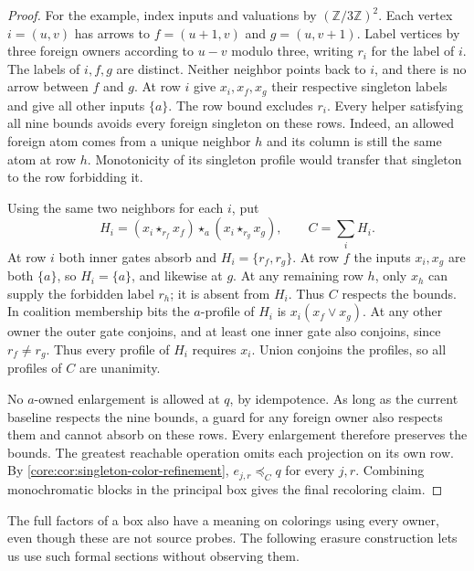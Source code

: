 \begin{proof}
For the example, index inputs and valuations by
$(\mathbb Z/3\mathbb Z)^2$. Each vertex $i=(u,v)$ has arrows to
$f=(u+1,v)$ and $g=(u,v+1)$. Label vertices by three foreign owners
according to $u-v$ modulo three, writing $r_i$ for the label of $i$.
The labels of $i,f,g$ are distinct. Neither neighbor points back to $i$,
and there is no arrow between $f$ and $g$.
At row $i$ give $x_i,x_f,x_g$ their respective singleton labels
and give all other inputs $\{a\}$. The row bound excludes $r_i$.
Every helper satisfying all nine bounds avoids every foreign singleton
on these rows. Indeed, an allowed foreign atom comes from a unique
neighbor $h$ and its column is still the same atom at row $h$.
Monotonicity of its singleton profile would transfer that singleton
to the row forbidding it.

Using the same two neighbors for each $i$, put
\[
 H_i=(x_i\star_{r_f}x_f)\star_a(x_i\star_{r_g}x_g),
 \qquad C=\sum_i H_i .
\]
At row $i$ both inner gates absorb and $H_i=\{r_f,r_g\}$. At row
$f$ the inputs $x_i,x_g$ are both $\{a\}$, so $H_i=\{a\}$, and
likewise at $g$. At any remaining row $h$, only $x_h$ can supply
the forbidden label $r_h$; it is absent from $H_i$. Thus $C$ respects
the bounds. In coalition membership bits the $a$-profile of $H_i$
is $x_i(x_f\lor x_g)$. At any other owner the outer gate conjoins,
and at least one inner gate also conjoins, since $r_f\ne r_g$. Thus
every profile of $H_i$ requires $x_i$. Union conjoins the profiles,
so all profiles of $C$ are unanimity.

No $a$-owned enlargement is allowed at $q$, by idempotence.
As long as the current baseline respects the nine bounds, a guard
for any foreign owner also respects them and cannot absorb on these
rows. Every enlargement therefore preserves the bounds. The greatest
reachable operation omits each projection on its own row. By
\cref{core:cor:singleton-color-refinement}, $e_{j,r}\preceq_Cq$
for every $j,r$. Combining monochromatic blocks in the principal box
gives the final recoloring claim.
\end{proof}



The full factors of a box also have a meaning on colorings using every
owner, even though these are not source probes. The following erasure
construction lets us use such formal sections without observing them.

